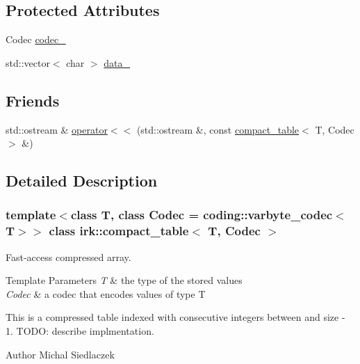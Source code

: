 \subsection*{Protected Attributes}
\begin{DoxyCompactItemize}
\item 
Codec \mbox{\hyperlink{classirk_1_1compact__table_a780f480df7180c7b750907dc1954e741}{codec\+\_\+}}
\item 
std\+::vector$<$ char $>$ \mbox{\hyperlink{classirk_1_1compact__table_adf7928280ada85abfdf858586aeadb78}{data\+\_\+}}
\end{DoxyCompactItemize}
\subsection*{Friends}
\begin{DoxyCompactItemize}
\item 
std\+::ostream \& \mbox{\hyperlink{classirk_1_1compact__table_aabbde77b5cb5faeef5fe72eff9624aa5}{operator$<$$<$}} (std\+::ostream \&, const \mbox{\hyperlink{classirk_1_1compact__table}{compact\+\_\+table}}$<$ T, Codec $>$ \&)
\end{DoxyCompactItemize}


\subsection{Detailed Description}
\subsubsection*{template$<$class T, class Codec = coding\+::varbyte\+\_\+codec$<$\+T$>$$>$\newline
class irk\+::compact\+\_\+table$<$ T, Codec $>$}

Fast-\/access compressed array. 


\begin{DoxyTemplParams}{Template Parameters}
{\em T} & the type of the stored values \\
\hline
{\em Codec} & a codec that encodes values of type {\ttfamily T}\\
\hline
\end{DoxyTemplParams}
This is a compressed table indexed with consecutive integers between {} and {\ttfamily size -\/ 1}. T\+O\+DO\+: describe implmentation.

\begin{DoxyAuthor}{Author}
Michal Siedlaczek 
\end{DoxyAuthor}


